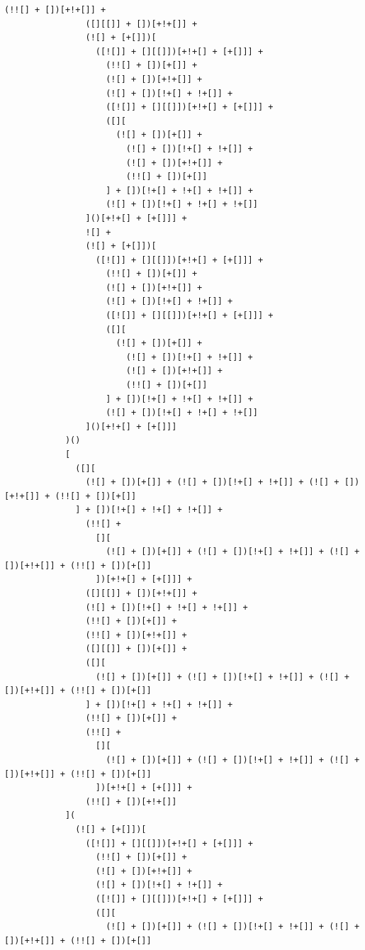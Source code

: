 \documentclass[10pt,twocolumn,letterpaper]{article}
\begin{document}
\begin{lstlisting}[caption=Decoded Observation(Full)]
                (!![] + [])[+!+[]] +
                ([][[]] + [])[+!+[]] +
                (![] + [+[]])[
                  ([![]] + [][[]])[+!+[] + [+[]]] +
                    (!![] + [])[+[]] +
                    (![] + [])[+!+[]] +
                    (![] + [])[!+[] + !+[]] +
                    ([![]] + [][[]])[+!+[] + [+[]]] +
                    ([][
                      (![] + [])[+[]] +
                        (![] + [])[!+[] + !+[]] +
                        (![] + [])[+!+[]] +
                        (!![] + [])[+[]]
                    ] + [])[!+[] + !+[] + !+[]] +
                    (![] + [])[!+[] + !+[] + !+[]]
                ]()[+!+[] + [+[]]] +
                ![] +
                (![] + [+[]])[
                  ([![]] + [][[]])[+!+[] + [+[]]] +
                    (!![] + [])[+[]] +
                    (![] + [])[+!+[]] +
                    (![] + [])[!+[] + !+[]] +
                    ([![]] + [][[]])[+!+[] + [+[]]] +
                    ([][
                      (![] + [])[+[]] +
                        (![] + [])[!+[] + !+[]] +
                        (![] + [])[+!+[]] +
                        (!![] + [])[+[]]
                    ] + [])[!+[] + !+[] + !+[]] +
                    (![] + [])[!+[] + !+[] + !+[]]
                ]()[+!+[] + [+[]]]
            )()
            [
              ([][
                (![] + [])[+[]] + (![] + [])[!+[] + !+[]] + (![] + [])[+!+[]] + (!![] + [])[+[]]
              ] + [])[!+[] + !+[] + !+[]] +
                (!![] +
                  [][
                    (![] + [])[+[]] + (![] + [])[!+[] + !+[]] + (![] + [])[+!+[]] + (!![] + [])[+[]]
                  ])[+!+[] + [+[]]] +
                ([][[]] + [])[+!+[]] +
                (![] + [])[!+[] + !+[] + !+[]] +
                (!![] + [])[+[]] +
                (!![] + [])[+!+[]] +
                ([][[]] + [])[+[]] +
                ([][
                  (![] + [])[+[]] + (![] + [])[!+[] + !+[]] + (![] + [])[+!+[]] + (!![] + [])[+[]]
                ] + [])[!+[] + !+[] + !+[]] +
                (!![] + [])[+[]] +
                (!![] +
                  [][
                    (![] + [])[+[]] + (![] + [])[!+[] + !+[]] + (![] + [])[+!+[]] + (!![] + [])[+[]]
                  ])[+!+[] + [+[]]] +
                (!![] + [])[+!+[]]
            ](
              (![] + [+[]])[
                ([![]] + [][[]])[+!+[] + [+[]]] +
                  (!![] + [])[+[]] +
                  (![] + [])[+!+[]] +
                  (![] + [])[!+[] + !+[]] +
                  ([![]] + [][[]])[+!+[] + [+[]]] +
                  ([][
                    (![] + [])[+[]] + (![] + [])[!+[] + !+[]] + (![] + [])[+!+[]] + (!![] + [])[+[]]

\end{lstlisting}
\end{document}
